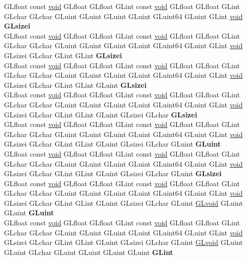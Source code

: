 \begin{DoxyCompactItemize}
\begin{tabbing}
\>GLfloat const \hyperlink{interfacevoid}{void} GLfloat GLfloat GLint const \hyperlink{interfacevoid}{void} GLfloat GLfloat GLint GLchar GLchar GLuint GLuint GLuint GLuint GLuint64 GLuint GLint \hyperlink{interfacevoid}{void} {\bfseries GLsizei}\\
\>GLfloat const \hyperlink{interfacevoid}{void} GLfloat GLfloat GLint const \hyperlink{interfacevoid}{void} GLfloat GLfloat GLint GLchar GLchar GLuint GLuint GLuint GLuint GLuint64 GLuint GLint \hyperlink{interfacevoid}{void} GLsizei GLchar GLint GLint {\bfseries GLsizei}\\
\>GLfloat const \hyperlink{interfacevoid}{void} GLfloat GLfloat GLint const \hyperlink{interfacevoid}{void} GLfloat GLfloat GLint GLchar GLchar GLuint GLuint GLuint GLuint GLuint64 GLuint GLint \hyperlink{interfacevoid}{void} GLsizei GLchar GLint GLint GLuint {\bfseries GLsizei}\\
\>GLfloat const \hyperlink{interfacevoid}{void} GLfloat GLfloat GLint const \hyperlink{interfacevoid}{void} GLfloat GLfloat GLint GLchar GLchar GLuint GLuint GLuint GLuint GLuint64 GLuint GLint \hyperlink{interfacevoid}{void} GLsizei GLchar GLint GLint GLuint GLsizei GLchar {\bfseries GLsizei}\\
\>GLfloat const \hyperlink{interfacevoid}{void} GLfloat GLfloat GLint const \hyperlink{interfacevoid}{void} GLfloat GLfloat GLint GLchar GLchar GLuint GLuint GLuint GLuint GLuint64 GLuint GLint \hyperlink{interfacevoid}{void} GLsizei GLchar GLint GLint GLuint GLsizei GLchar GLuint {\bfseries GLuint}\\
\>GLfloat const \hyperlink{interfacevoid}{void} GLfloat GLfloat GLint const \hyperlink{interfacevoid}{void} GLfloat GLfloat GLint GLchar GLchar GLuint GLuint GLuint GLuint GLuint64 GLuint GLint \hyperlink{interfacevoid}{void} GLsizei GLchar GLint GLint GLuint GLsizei GLchar GLuint {\bfseries GLsizei}\\
\>GLfloat const \hyperlink{interfacevoid}{void} GLfloat GLfloat GLint const \hyperlink{interfacevoid}{void} GLfloat GLfloat GLint GLchar GLchar GLuint GLuint GLuint GLuint GLuint64 GLuint GLint \hyperlink{interfacevoid}{void} GLsizei GLchar GLint GLint GLuint GLsizei GLchar GLuint \hyperlink{interfacevoid}{GLvoid} GLuint GLuint {\bfseries GLuint}\\
\>GLfloat const \hyperlink{interfacevoid}{void} GLfloat GLfloat GLint const \hyperlink{interfacevoid}{void} GLfloat GLfloat GLint GLchar GLchar GLuint GLuint GLuint GLuint GLuint64 GLuint GLint \hyperlink{interfacevoid}{void} GLsizei GLchar GLint GLint GLuint GLsizei GLchar GLuint \hyperlink{interfacevoid}{GLvoid} GLuint GLuint GLchar GLuint GLuint GLuint GLuint {\bfseries GLint}\\

\end{tabbing}
\end{DoxyCompactItemize}
